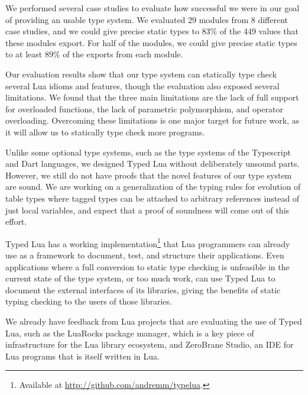\documentclass[preprint]{sigplanconf}
\begin{document}
We performed several
case studies to evaluate how successful we were in our goal of
providing an usable type system.
We evaluated 29 modules from 8 different case studies,
and we could give precise static types to 83\% of the 449
values that these modules export.
For half of the modules, we could give precise static types to
at least 89\% of the exports from each module.

Our evaluation results show that our type system can statically
type check several Lua idioms and features, though the evaluation
also exposed several limitations.
We found that the three main limitations are
the lack of full support for overloaded functions, the lack
of parametric polymorphism, and operator overloading.
Overcoming these limitations is one major target for future work,
as it will allow us to statically type check more programs.

Unlike some optional type systems, such as the type systems
of the Typescript and Dart languages, we designed Typed Lua without deliberately unsound parts.
However, we still do not have proofs that the novel features of
our type system are sound. We are working on a generalization
of the typing rules for evolution of table types where tagged
types can be attached to arbitrary references instead of
just local variables, and expect that a proof of soundness
will come out of this effort.

Typed Lua has a working implementation\footnote{Available
at \url{http://github.com/andremm/typelua}.} that
Lua programmers can already use as a framework to
document, test, and structure their applications.
Even applications where a full conversion to static
type checking is unfeasible in the current state
of the type system, or too much work, can use Typed
Lua to document the external interfaces of its
libraries, giving the benefits of static typing
checking to the users of those libraries.

We already have feedback from Lua projects
that are evaluating the use of Typed Lua, such
as the LuaRocks package manager, which is a key
piece of infrastructure for the Lua library ecosystem,
and ZeroBrane Studio, an IDE for Lua programs that is itself
written in Lua.



\end{document}
